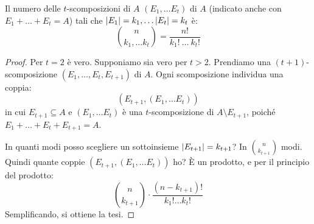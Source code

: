 \begin{prop}\label{coeff_mult_valore}
Il numero delle $t$-scomposizioni di $A$ $(E_1, \dots E_t)$ di $A$ (indicato anche con $E_1 + \dots + E_t = A$) tali che $\left\lvert{E_1}\right\rvert = k_1, \dots \left\lvert{E_t}\right\rvert = k_t$ \`e:
\begin{equation}
\binom{n}{k_1, \dots k_t} = \frac{n!}{k_1! \ \dots \ k_t!}
\end{equation}
\end{prop}
\begin{proof}
Per $t = 2$ \`e vero. Supponiamo sia vero per $t > 2$. Prendiamo una $(t+1)$-scomposizione $(E_1, \dots, E_t, E_{t+1})$ di $A$. Ogni scomposizione individua una coppia:
\[
\left( E_{t+1}, (E_1, \dots E_t) \right)
\]
in cui $E_{t+1} \subseteq A$ e $(E_1, \dots E_t)$ \`e una $t$-scomposizione di $A \setminus E_{t+1}$, poich\'e $E_1 + \dots + E_t + E_{t+1} = A$.

In quanti modi posso scegliere un sottoinsieme $\left\lvert{E_{t+1}}\right\rvert = k_{t+1}$? In $\binom{n}{k_{t+1}}$ modi. Quindi quante coppie $(E_{t+1}, (E_1, \dots E_t))$ ho? \`E un prodotto, e per il principio del prodotto:
\[
\binom{n}{k_{t+1}} \cdot \frac{(n - k_{t+1})!}{k_1! \dots k_{t}!}
\]
Semplificando, si ottiene la tesi.
\end{proof}

